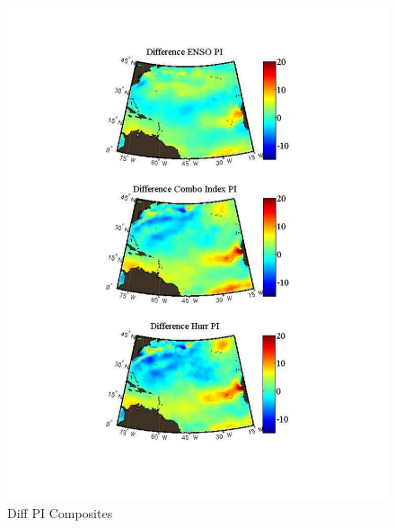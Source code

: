 \documentclass[]{article}
\begin{document}
\begin{figure}[ht]
\begin{minipage}[b]{0.55\linewidth}
\includegraphics[width=\textwidth]{figures/comboIndex/composites/compareMDRCompositesPI.pdf}
\caption{Diff PI Composites}
\label{fig:figure33}
\end{minipage}
\end{figure}
\end{document}
